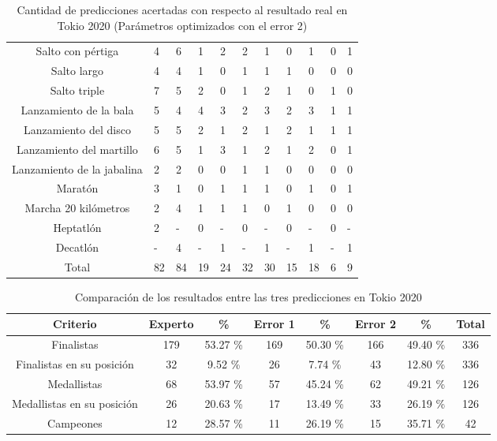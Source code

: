 \begin{table}[H]
{\begin{tabular}{|c|P{1.3cm}|P{1.2cm}|P{1.3cm}|P{1.2cm}|P{1.4cm}|P{1.2cm}|P{1.45cm}|P{1.2cm}|P{1.3cm}|P{1.2cm}|}
            Salto con pértiga & 4 & 6 & 1 & 2 & 2 & 1 & 0 & 1 & 0 & 1 \\
            Salto largo & 4 & 4 & 1 & 0 & 1 & 1 & 1 & 0 & 0 & 0 \\
            Salto triple & 7 & 5 & 2 & 0 & 1 & 2 & 1 & 0 & 1 & 0 \\
            Lanzamiento de la bala & 5 & 4 & 4 & 3 & 2 & 3 & 2 & 3 & 1 & 1 \\
            Lanzamiento del disco & 5 & 5 & 2 & 1 & 2 & 1 & 2 & 1 & 1 & 1 \\
            Lanzamiento del martillo & 6 & 5 & 1 & 3 & 1 & 2 & 1 & 2 & 0 & 1 \\
            Lanzamiento de la jabalina & 2 & 2 & 0 & 0 & 1 & 1 & 0 & 0 & 0 & 0 \\
            Maratón & 3 & 1 & 0 & 1 & 1 & 1 & 0 & 1 & 0 & 1 \\
            Marcha 20 kilómetros & 2 & 4 & 1 & 1 & 1 & 0 & 1 & 0 & 0 & 0 \\
            Heptatlón & 2 & - & 0 & - & 0 & - & 0 & - & 0 & - \\
            Decatlón & - & 4 & - & 1 & - & 1 & - & 1 & - & 1 \\
            \hline
            Total & 82 & 84 & 19 & 24 & 32 & 30 & 15 & 18 & 6 & 9 \\ \hline
        \end{tabular}
        \caption{Cantidad de predicciones acertadas con respecto al resultado real en Tokio 2020 (Parámetros optimizados con el error 2)}
        \label{tab:error2tokio}
    }
\end{table}

\begin{table}[H]
    \centering
    \resizebox{15cm}{!} {
        \begin{tabular}{|c|c|c|c|c|c|c|c|}
            \hline
            Criterio                   & Experto &    \%    & Error 1 &    \%    & Error 2 &    \%    & Total \\\hline
            Finalistas                 & 179    & 53.27 \% & 169     & 50.30 \% & 166     & 49.40 \% & 336   \\
            Finalistas en su posición  & 32     &  9.52 \% & 26      &  7.74 \% & 43      & 12.80 \% & 336   \\
            Medallistas                & 68     & 53.97 \% & 57      & 45.24 \% & 62      & 49.21 \% & 126   \\
            Medallistas en su posición & 26     & 20.63 \% & 17      & 13.49 \% & 33      & 26.19 \% & 126   \\ 
            Campeones                  & 12     & 28.57 \% & 11      & 26.19 \% & 15      & 35.71 \% & 42   \\ \hline
        \end{tabular}
        \caption{Comparación de los resultados entre las tres predicciones en Tokio 2020}
        \label{tab:resumentokio}
    }
\end{table}

